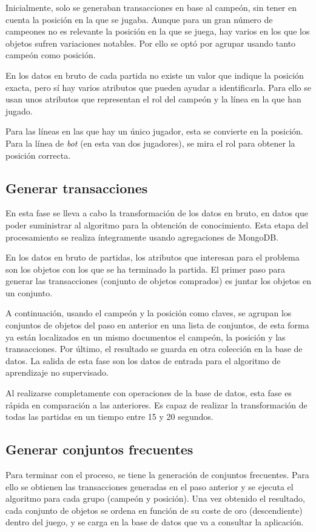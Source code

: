 Inicialmente, solo se generaban transacciones en base al campeón, sin tener en cuenta la posición en la que se jugaba. Aunque para un gran número de campeones no es relevante la posición en la que se juega, hay varios en los que los objetos sufren variaciones notables. Por ello se optó por agrupar usando tanto campeón como posición.

En los datos en bruto de cada partida no existe un valor que indique la posición exacta, pero sí hay varios atributos que pueden ayudar a identificarla. Para ello se usan unos atributos que representan el rol del campeón y la línea en la que han jugado.

Para las líneas en las que hay un único jugador, esta se convierte en la posición. Para la línea de \textit{bot} (en esta van dos jugadores), se mira el rol para obtener la posición correcta.

\subsection{Generar transacciones}
En esta fase se lleva a cabo la transformación de los datos en bruto, en datos que poder suministrar al algoritmo para la obtención de conocimiento. Esta etapa del procesamiento se realiza íntegramente usando agregaciones de MongoDB.

En los datos en bruto de partidas, los atributos que interesan para el problema son los objetos con los que se ha terminado la partida. El primer paso para generar las transacciones (conjunto de objetos comprados) es juntar los objetos en un conjunto.

A continuación, usando el campeón y la posición como claves, se agrupan los conjuntos de objetos del paso en anterior en una lista de conjuntos, de esta forma ya están localizados en un mismo documentos el campeón, la posición y las transacciones. Por último, el resultado se guarda en otra colección en la base de datos. La salida de esta fase son los datos de entrada para el algoritmo de aprendizaje no supervisado.

Al realizarse completamente con operaciones de la base de datos, esta fase es rápida en comparación a las anteriores. Es capaz de realizar la transformación de todas las partidas en un tiempo entre 15 y 20 segundos.

\subsection{Generar conjuntos frecuentes}
Para terminar con el proceso, se tiene la generación de conjuntos frecuentes. Para ello se obtienen las transacciones generadas en el paso anterior y se ejecuta el algoritmo para cada grupo (campeón y posición). Una vez obtenido el resultado, cada conjunto de objetos se ordena en función de su coste de oro (descendiente) dentro del juego, y se carga en la base de datos que va a consultar la aplicación.

